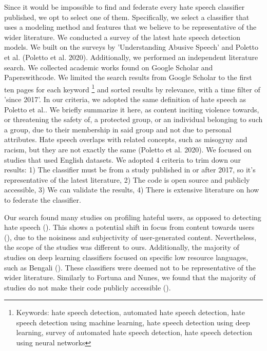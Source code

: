 \documentclass[letterpaper]{article} %
\begin{document}
Since it would be impossible to find and federate every hate speech classifier published, we opt to select one of them. Specifically, we select a classifier that uses a modeling method and features that we believe to be representative of the wider literature. We conducted a survey of the latest hate speech detection models. We built on the surveys by 'Understanding Abusive Speech' and Poletto et al. (Poletto et al. 2020). Additionally, we performed an independent literature search. We collected academic works found on Google Scholar and Paperswithcode.  We limited the search results from Google Scholar to the first ten pages for each keyword \footnote{Keywords: hate speech detection, automated hate speech detection, hate speech detection using machine learning, hate speech detection using deep learning, survey of automated hate speech detection, hate speech detection using neural networks} and sorted results by relevance, with a time filter of 'since 2017'. In our criteria, we adopted the same definition of hate speech as Poletto et al.. We briefly summarize it here, as content inciting violence towards, or threatening the safety of, a protected group, or an individual belonging to such a group, due to their membership in said group and not due to personal attributes. Hate speech overlaps with related concepts, such as misogyny and racism, but they are not exactly the same (Poletto et al. 2020). We focused on studies that used English datasets. We adopted 4 criteria to trim down our results: 1) The classifier must be from a study published in or after 2017, so it's representative of the latest literature, 2) The code is open source and publicly accessible, 3) We can validate the results, 4) There is extensive literature on how to federate the classifier.

Our search found many studies on profiling hateful users, as opposed to detecting hate speech (). This shows a potential shift in focus from content towards users (), due to the noisiness and subjectivity of user-generated content. Nevertheless, the scope of the studies was different to ours. Additionally, the majority of studies on deep learning classifiers focused on specific low resource languages, such as Bengali (). These classifiers were deemed not to be representative of the wider literature. Similarly to Fortuna and Nunes, we found that the majority of studies do not make their code publicly accessible (). 
\end{document}
